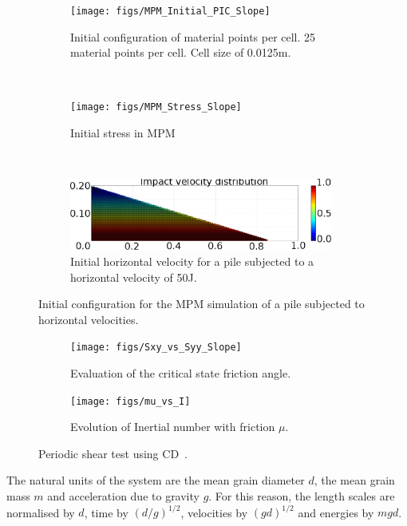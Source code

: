 \documentclass[3p,times,procedia,number]{elsarticle}
\begin{document}
\begin{figure}[tbhp]
  \centering
  \begin{subfigure}[t]{0.75\textwidth}
    \centering
    \texttt{[image: figs/MPM\_Initial\_PIC\_Slope]}
    \caption{Initial configuration of material points per cell. 25 material points 
    per cell. Cell size of 0.0125m.}
    \label{fig:MPM_Initial_PIC_Slope}
  \end{subfigure} \\
  \begin{subfigure}[t]{0.95\textwidth}
    \centering
    \texttt{[image: figs/MPM\_Stress\_Slope]}
    \caption{Initial stress in MPM}
    \label{fig:MPM_Stress_Slope}
  \end{subfigure} \\
  \begin{subfigure}[t]{0.95\textwidth}
    \centering
    \includegraphics[width=0.95\textwidth]{figs/MPM_Velocity_Slope}
    \caption{Initial horizontal velocity for a pile subjected to a horizontal 
    velocity of 50J.}
    \label{fig:MPM_Velocity_Slope}
  \end{subfigure}
  \caption{Initial configuration for the MPM simulation of a pile subjected to 
  horizontal velocities.}
  \label{fig:MPM_Slope_setup}
\end{figure}


\begin{figure}[tbhp]
  \centering
  \begin{subfigure}[t]{0.475\textwidth}
    \texttt{[image: figs/Sxy\_vs\_Syy\_Slope]}
    \caption{Evaluation of the critical state friction angle.}
    \label{fig:Sxy_vs_Syy_Slope}
  \end{subfigure}
  \begin{subfigure}[t]{0.475\textwidth}
    \texttt{[image: figs/mu\_vs\_I]}
    \caption{Evolution of Inertial number with friction $\mu$.}
    \label{fig:mu_vs_I}
  \end{subfigure}
  \caption{Periodic shear test using CD~\citep{Mutabaruka2013}.}
  \label{fig:Shear_Test_Slope}
\end{figure}

The natural units of the system 
are the mean grain diameter $d$, the mean grain 
mass $m$ and acceleration due to gravity $g$. For this reason, the length 
scales are normalised by $d$, time by $(d/g)^{1/2}$, velocities by $(gd)^{1/2}$ 
and energies by $mgd$. 
\end{document}
